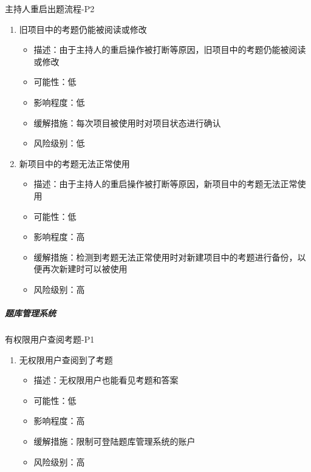 \documentclass[hyperref, a4paper]{ctexart}
\providecommand{\tightlist}{%
  \setlength{\itemsep}{0pt}\setlength{\parskip}{0pt}}
\let\oldsubparagraph\subparagraph
\renewcommand{\subparagraph}[1]{\oldsubparagraph{#1}\mbox{}}
\begin{document}
主持人重启出题流程-P2

\begin{enumerate}
\def\labelenumi{\arabic{enumi}.}
\tightlist
\item
  旧项目中的考题仍能被阅读或修改

  \begin{itemize}
  \tightlist
  \item
    描述：由于主持人的重启操作被打断等原因，旧项目中的考题仍能被阅读或修改
  \item
    可能性：低
  \item
    影响程度：低
  \item
    缓解措施：每次项目被使用时对项目状态进行确认
  \item
    风险级别：低
  \end{itemize}
\item
  新项目中的考题无法正常使用

  \begin{itemize}
  \tightlist
  \item
    描述：由于主持人的重启操作被打断等原因，新项目中的考题无法正常使用
  \item
    可能性：低
  \item
    影响程度：高
  \item
    缓解措施：检测到考题无法正常使用时对新建项目中的考题进行备份，以便再次新建时可以被使用
  \item
    风险级别：高
  \end{itemize}
\end{enumerate}

\hypertarget{ux9898ux5e93ux7ba1ux7406ux7cfbux7edf-1}{%
\subparagraph{题库管理系统}\label{ux9898ux5e93ux7ba1ux7406ux7cfbux7edf-1}}

有权限用户查阅考题-P1

\begin{enumerate}
\def\labelenumi{\arabic{enumi}.}
\tightlist
\item
  无权限用户查阅到了考题

  \begin{itemize}
  \tightlist
  \item
    描述：无权限用户也能看见考题和答案
  \item
    可能性：低
  \item
    影响程度：高
  \item
    缓解措施：限制可登陆题库管理系统的账户
  \item
    风险级别：高
  \end{itemize}
\end{enumerate}
\end{document}
